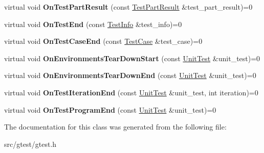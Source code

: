\begin{DoxyCompactItemize}
virtual void {\bfseries On\+Test\+Part\+Result} (const \mbox{\hyperlink{classtesting_1_1_test_part_result}{Test\+Part\+Result}} \&test\+\_\+part\+\_\+result)=0
\item 
\mbox{\label{classtesting_1_1_test_event_listener_abb1c44525ef038500608b5dc2f17099b}} 
virtual void {\bfseries On\+Test\+End} (const \mbox{\hyperlink{classtesting_1_1_test_info}{Test\+Info}} \&test\+\_\+info)=0
\item 
\mbox{\label{classtesting_1_1_test_event_listener_ae61985e2ef76ac78379b077be57a9c36}} 
virtual void {\bfseries On\+Test\+Case\+End} (const \mbox{\hyperlink{classtesting_1_1_test_case}{Test\+Case}} \&test\+\_\+case)=0
\item 
\mbox{\label{classtesting_1_1_test_event_listener_a468b5e6701bcb86cb2c956caadbba5e4}} 
virtual void {\bfseries On\+Environments\+Tear\+Down\+Start} (const \mbox{\hyperlink{classtesting_1_1_unit_test}{Unit\+Test}} \&unit\+\_\+test)=0
\item 
\mbox{\label{classtesting_1_1_test_event_listener_a9ea04fa7f447865ba76df35e12ba2092}} 
virtual void {\bfseries On\+Environments\+Tear\+Down\+End} (const \mbox{\hyperlink{classtesting_1_1_unit_test}{Unit\+Test}} \&unit\+\_\+test)=0
\item 
\mbox{\label{classtesting_1_1_test_event_listener_a550fdb3e55726e4cefa09f5697941425}} 
virtual void {\bfseries On\+Test\+Iteration\+End} (const \mbox{\hyperlink{classtesting_1_1_unit_test}{Unit\+Test}} \&unit\+\_\+test, int iteration)=0
\item 
\mbox{\label{classtesting_1_1_test_event_listener_ad15b6246d94c268e233487a86463ef3d}} 
virtual void {\bfseries On\+Test\+Program\+End} (const \mbox{\hyperlink{classtesting_1_1_unit_test}{Unit\+Test}} \&unit\+\_\+test)=0
\end{DoxyCompactItemize}


The documentation for this class was generated from the following file\+:\begin{DoxyCompactItemize}
\item 
src/gtest/gtest.\+h\end{DoxyCompactItemize}

